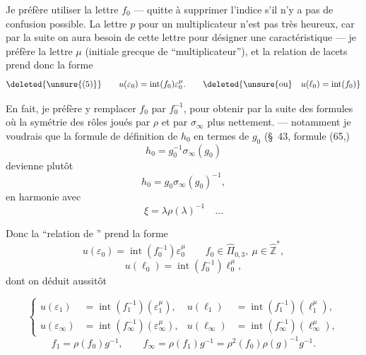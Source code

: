Je préfère utiliser la lettre $f_0$ --- quitte à supprimer l'indice s'il n'y a pas de confusion possible. La lettre $p$ pour un multiplicateur n'est pas  très heureux, car par la suite  on aura  besoin de cette lettre pour désigner une caractéristique --- je préfère la lettre $\mu$ (initiale grecque de ``multiplicateur''), et la relation de lacets prend donc la forme
\[
\deleted{\unsure{(5)}}\qquad
u(\varepsilon_0)=\operatorname{int}(f_0)\varepsilon_0^\mu.
\qquad
\deleted{\unsure{\text{ou}}\quad u(\ell_0)=\operatorname{int}(f_0)}
\]

En fait, je préfère y remplacer $f_0$ par $f_0^{-1}$, pour obtenir par la suite des formules où la symétrie des rôles joués par $\rho$ et par $\sigma_\infty$  plus nettement. --- notamment je voudrais que la formule de définition de $h_0$ en termes de $g_0$ (\S\ 43, formule (65,)
\[
h_0=g_0^{-1}\sigma_\infty(g_0)
\]
devienne plutôt
\[
h_0=g_0\sigma_\infty(g_0)^{-1},
\]
en harmonie avec
\[
\xi=\lambda\rho(\lambda)^{-1}\quad\dots
\]

Donc la ``relation de '' prend la forme
\[
\tag{5}
u(\varepsilon_0)=\operatorname{int}(f_0^{-1})\varepsilon_0^\mu
\qquad f_0\in\widehat{\Pi}_{0,3},\ \mu\in\widehat{\mathbb Z}^{*},
\]
\[
\tag{6}
u(\ell_0)=\operatorname{int}(f_0^{-1})\ell_0^\mu,
\]
dont on déduit aussitôt



\[
\tag{7}
\left\{
\begin{aligned}
u(\varepsilon_1)&=\operatorname{int}(f_1^{-1})(\varepsilon_1^\mu),
&u(\ell_1)&=\operatorname{int}(f_1^{-1})(\ell_1^\mu),\\
u(\varepsilon_\infty)&=\operatorname{int}(f_\infty^{-1})(\varepsilon_\infty^\mu),
&u(\ell_\infty)&=\operatorname{int}(f_\infty^{-1})(\ell_\infty^\mu),
\end{aligned}
\right.
\]
\[
\tag{8}
f_1=\rho(f_0)g^{-1},\qquad
f_\infty=\rho(f_1)g^{-1}=\rho^2(f_0)\rho(g)^{-1}g^{-1}.
\]

